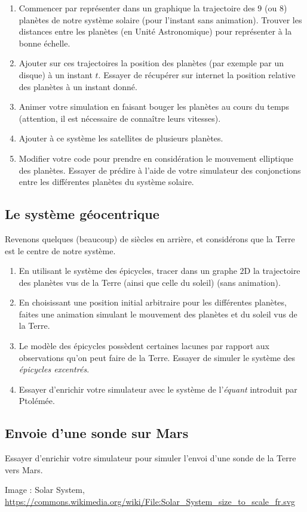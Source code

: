 \documentclass{../ficheTDTP}
\begin{document}
\begin{enumerate}
	\item Commencer par représenter dans un graphique la trajectoire des $9$ (ou $8$) planètes de notre système solaire (pour l'instant sans animation). Trouver les distances entre les planètes (en Unité Astronomique) pour représenter à la bonne échelle.
	\item Ajouter sur ces trajectoires la position des planètes (par exemple par un disque) à un instant $t$. Essayer de récupérer sur internet la position relative des planètes à un instant donné.
	\item Animer votre simulation en faisant bouger les planètes au cours du temps (attention, il est nécessaire de connaître leurs vitesses).
	\item Ajouter à ce système les satellites de plusieurs planètes.
	\item Modifier votre code pour prendre en considération le mouvement elliptique des planètes. Essayer de prédire à l'aide de votre simulateur des conjonctions entre les différentes planètes du système solaire.
\end{enumerate}

	\subsection{Le système géocentrique} Revenons quelques (beaucoup) de siècles en arrière, et considérons que la Terre est le centre de notre système.
\begin{enumerate}
	\item En utilisant le système des épicycles, tracer dans un graphe $2$D la trajectoire des planètes vus de la Terre (ainsi que celle du soleil) (sans animation).
	\item En choisissant une position initial arbitraire pour les différentes planètes, faites une animation simulant le mouvement des planètes et du soleil vus de la Terre.
	\item Le modèle des épicycles possèdent certaines lacunes par rapport aux observations qu'on peut faire de la Terre. Essayer de simuler le système des \textit{épicycles excentrés}.
	\item Essayer d'enrichir votre simulateur avec le système de l'\textit{équant} introduit par Ptolémée.
\end{enumerate}


	\subsection{Envoie d'une sonde sur Mars} Essayer d'enrichir votre simulateur pour simuler l'envoi d'une sonde de la Terre vers Mars. 
	
\vspace{2cm}
\footnotesize{Image : Solar System, \url{https://commons.wikimedia.org/wiki/File:Solar_System_size_to_scale_fr.svg}}


	
\end{document}
